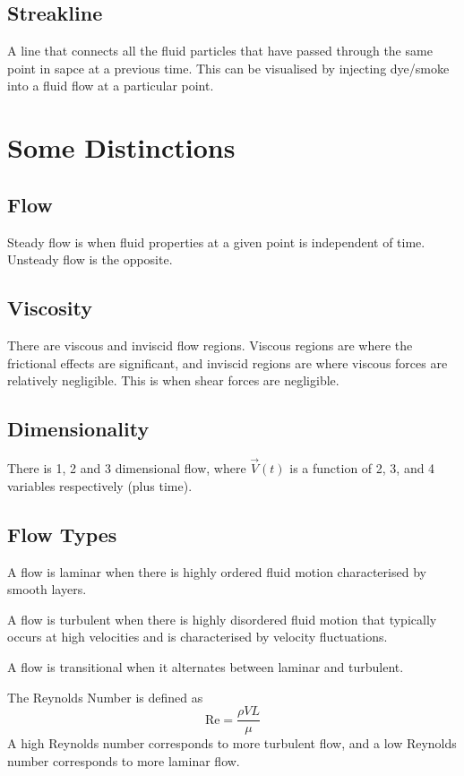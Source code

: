 \documentclass[12pt]{article}
\begin{document}
\subsection{Streakline}
A line that connects all the fluid particles that have passed through the same point in sapce at a previous time. This can be visualised by injecting dye/smoke into a fluid flow at a particular point.

\section{Some Distinctions}
\subsection{Flow}
Steady flow is when fluid properties at a given point is independent of time. Unsteady flow is the opposite.
\subsection{Viscosity}
There are viscous and inviscid flow regions. Viscous regions are where the frictional effects are significant, and inviscid regions are where viscous forces are relatively negligible. This is when shear forces are negligible.
\subsection{Dimensionality}
There is 1, 2 and 3 dimensional flow, where $\vec{V}(t)$ is a function of 2, 3, and 4 variables respectively (plus time).
\subsection{Flow Types}
\begin{defn}
	A flow is laminar when there is highly ordered fluid motion characterised by smooth layers.
\end{defn}
\begin{defn}
	A flow is turbulent when there is highly disordered fluid motion that typically occurs at high velocities and is characterised by velocity fluctuations.
\end{defn}
\begin{defn}
	A flow is transitional when it alternates between laminar and turbulent.
\end{defn}

The Reynolds Number is defined as
$$\text{Re} = \frac{\rho VL}{\mu}$$
A high Reynolds number corresponds to more turbulent flow, and a low Reynolds number corresponds to more laminar flow.
\end{document}
